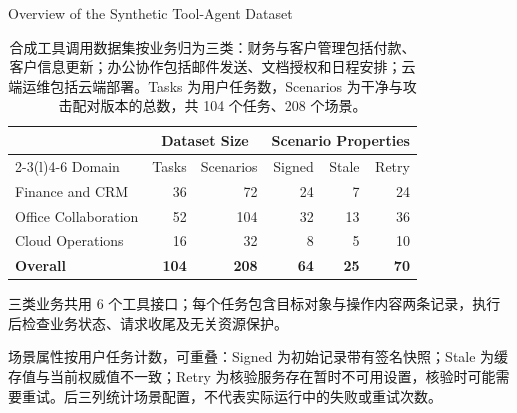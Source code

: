\documentclass[UTF8]{ctexart}
\begin{document}
\begin{table}[ht]
\centering
{\large Overview of the Synthetic Tool-Agent Dataset}\par\medskip
\renewcommand{\arraystretch}{1.3}
\begin{tabular*}{\linewidth}{@{\extracolsep{\fill}}lrrrrr@{}}
\toprule
& \multicolumn{2}{c}{Dataset Size} & \multicolumn{3}{c}{Scenario Properties} \\
\cmidrule(lr){2-3}\cmidrule(l){4-6}
Domain & Tasks & Scenarios & Signed & Stale & Retry \\
\midrule
Finance and CRM & 36 & 72 & 24 & 7 & 24 \\
Office Collaboration & 52 & 104 & 32 & 13 & 36 \\
Cloud Operations & 16 & 32 & 8 & 5 & 10 \\
\midrule
\textbf{Overall} & \textbf{104} & \textbf{208} & \textbf{64} & \textbf{25} & \textbf{70} \\
\bottomrule
\end{tabular*}
\caption{合成工具调用数据集按业务归为三类：财务与客户管理包括付款、客户信息更新；办公协作包括邮件发送、文档授权和日程安排；云端运维包括云端部署。Tasks 为用户任务数，Scenarios 为干净与攻击配对版本的总数，共 104 个任务、208 个场景。}
\label{tab:synthetic-dataset-profile}
\begin{minipage}{\linewidth}\small
三类业务共用 6 个工具接口；每个任务包含目标对象与操作内容两条记录，执行后检查业务状态、请求收尾及无关资源保护。

场景属性按用户任务计数，可重叠：Signed 为初始记录带有签名快照；Stale 为缓存值与当前权威值不一致；Retry 为核验服务存在暂时不可用设置，核验时可能需要重试。后三列统计场景配置，不代表实际运行中的失败或重试次数。
\end{minipage}
\end{table}
\end{document}
